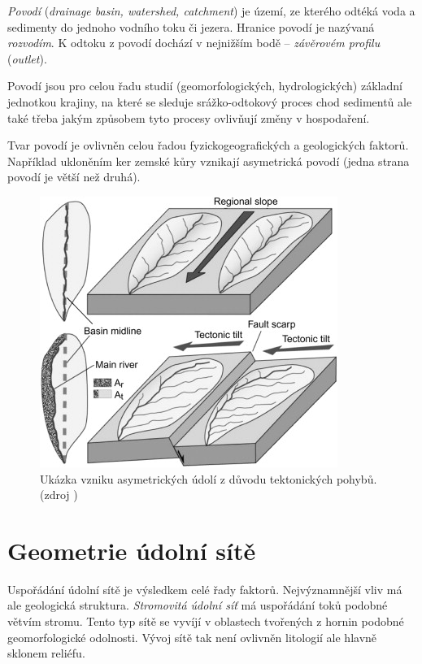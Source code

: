 \emph{Povodí} (\textit{drainage basin, watershed, catchment}) je území, ze kterého odtéká voda a sedimenty do jednoho vodního toku či jezera. Hranice povodí je nazývaná \emph{rozvodím}. K odtoku z povodí dochází v nejnižším bodě -- \emph{závěrovém profilu} (\textit{outlet}). 

Povodí jsou pro celou řadu studií (geomorfologických, hydrologických) základní jednotkou krajiny, na které se sleduje srážko-odtokový proces chod sedimentů ale také třeba jakým způsobem tyto procesy ovlivňují změny v hospodaření. 

Tvar povodí je ovlivněn celou řadou fyzickogeografických a geologických faktorů. Například ukloněním ker zemské kůry vznikají asymetrická povodí (jedna strana povodí je větší než druhá). 

\begin{figure}
	\centering
	\includegraphics[width=1\linewidth]{obrazky/fluvial/watershed_tilt}
	\caption{Ukázka vzniku asymetrických údolí z důvodu tektonických pohybů. (zdroj \textcite{mahmoodAppraisalActiveTectonics2012})}
	\label{fig:watershedtilt}
\end{figure}

\section{Geometrie údolní sítě}
Uspořádání údolní sítě je výsledkem celé řady faktorů. Nejvýznamnější vliv má ale geologická struktura. \emph{Stromovitá údolní síť} má uspořádání toků podobné větvím stromu. Tento typ sítě se vyvíjí v oblastech tvořených z hornin podobné geomorfologické odolnosti. Vývoj sítě tak není ovlivněn litologií ale hlavně sklonem reliéfu. 
%
%

